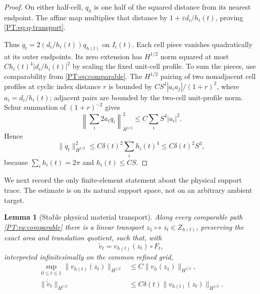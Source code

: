 \documentclass[11pt]{amsart}
\numberwithin{equation}{section}
\newtheorem{lemma}[theorem]{Lemma}
\theoremstyle{definition}
\theoremstyle{remark}
\begin{document}
\begin{proof}
On either half-cell, $q_h$ is one half of the squared distance from its
nearest endpoint.  The affine map multiplies that distance by
$1+\varepsilon d_i/h_i(t)$, proving \eqref{PT:eq:q-transport}.

Thus $\dot q_t=2(d_i/h_i(t))q_{h(t)}$ on $I_i(t)$.  Each cell piece
vanishes quadratically at its outer endpoints.  Its zero extension has
$H^{1/2}$ norm squared at most $Ch_i(t)^4|d_i/h_i(t)|^2$ by scaling the
fixed unit-cell profile.  To sum the pieces, use comparability from
\eqref{PT:eq:comparable}.  The $H^{1/2}$ pairing of two nonadjacent cell
profiles at cyclic index distance $r$ is bounded by
$CS^4|a_i a_j|/(1+r)^2$, where $a_i=d_i/h_i(t)$; adjacent pairs are
bounded by the two-cell unit-profile norm.  Schur summation of
$(1+r)^{-2}$ gives
\[
 \left\|\sum_i2a_iq_i\right\|_{H^{1/2}}^2
 \le C\sum_i S^4|a_i|^2.
\]
Hence
\[
 \|\dot q_t\|_{H^{1/2}}^2
 \le C\delta(t)^2\sum_i h_i(t)^4
 \le C\delta(t)^2S^3,
\]
because $\sum_i h_i(t)=2\pi$ and $h_i(t)\le CS$.
\end{proof}

We next record the only finite-element statement about the physical
support trace.  The estimate is on its natural support space, not on an
arbitrary ambient target.

\begin{lemma}[Stable physical material transport]\label{PT:lem:v-transport}
Along every comparable path \eqref{PT:eq:comparable} there is a linear
transport $z_1\mapsto z_t\in Z_{h(t)}$, preserving the exact area and
translation quotient, such that, with
\begin{equation}\label{PT:eq:vtilde}
 \widetilde v_t=v_{h(t)}(z_t)\circ F_t,
\end{equation}
interpreted infinitesimally on the common refined grid,
\begin{align}
 \sup_{0\le t\le1}\|v_{h(t)}(z_t)\|_{H^{1/2}}
 &\le C\|v_h(z_1)\|_{H^{1/2}},\label{PT:eq:v-uniform}\\
 \|\dot{\widetilde v}_t\|_{H^{1/2}}
 &\le C\delta(t)\|v_{h(t)}(z_t)\|_{H^{1/2}}.
 \label{PT:eq:vdot}
\end{align}
\end{lemma}
\end{document}
